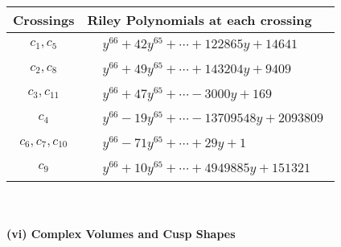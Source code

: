 \documentclass[1p]{elsarticle_modified}
\theoremstyle{definition}
\begin{document}
\begin{tabular}{m{50pt}|m{274pt}}
Crossings & \hspace{64pt}Riley Polynomials at each crossing \\
\hline $$\begin{aligned}c_{1},c_{5}\end{aligned}$$&$\begin{aligned}
&y^{66}+42 y^{65}+\cdots+122865 y+14641
\end{aligned}$\\
\hline $$\begin{aligned}c_{2},c_{8}\end{aligned}$$&$\begin{aligned}
&y^{66}+49 y^{65}+\cdots+143204 y+9409
\end{aligned}$\\
\hline $$\begin{aligned}c_{3},c_{11}\end{aligned}$$&$\begin{aligned}
&y^{66}+47 y^{65}+\cdots-3000 y+169
\end{aligned}$\\
\hline $$\begin{aligned}c_{4}\end{aligned}$$&$\begin{aligned}
&y^{66}-19 y^{65}+\cdots-13709548 y+2093809
\end{aligned}$\\
\hline $$\begin{aligned}c_{6},c_{7},c_{10}\end{aligned}$$&$\begin{aligned}
&y^{66}-71 y^{65}+\cdots+29 y+1
\end{aligned}$\\
\hline $$\begin{aligned}c_{9}\end{aligned}$$&$\begin{aligned}
&y^{66}+10 y^{65}+\cdots+4949885 y+151321
\end{aligned}$\\
\hline
\end{tabular}\\~\\
\newpage\flushleft \textbf{(vi) Complex Volumes and Cusp Shapes}
\end{document}
